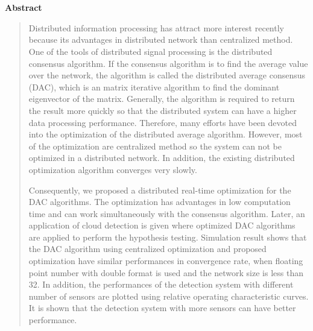 
\chapter*{}

\newenvironment{abstract} {  \pagestyle{empty}   \begin{center}   
{\Large \bfseries  Abstract}   \end{center}  
\begin{quote}} {\end{quote} }

\begin{abstract} 

\thispagestyle{empty}Distributed information processing has attract
more interest recently because its advantages in distributed network
than centralized method. One of the tools of distributed signal processing
is the distributed consensus algorithm. If the consensus algorithm
is to find the average value over the network, the algorithm is called
the distributed average consensus (DAC), which is an matrix iterative
algorithm to find the dominant eigenvector of the matrix. Generally,
the algorithm is required to return the result more quickly so that
the distributed system can have a higher data processing performance.
Therefore, many efforts have been devoted into the optimization of
the distributed average algorithm. However, most of the optimization
are centralized method so the system can not be optimized in a distributed
network. In addition, the existing distributed optimization algorithm
converges very slowly. 

Consequently, we proposed a distributed real-time optimization for
the DAC algorithms. The optimization has advantages in low computation
time and can work simultaneously with the consensus algorithm. Later,
an application of cloud detection is given where optimized DAC algorithms
are applied to perform the hypothesis testing. Simulation result shows
that the DAC algorithm using centralized optimization and proposed
optimization have similar performances in convergence rate, when floating
point number with double format is used and the network size is less
than 32. In addition, the performances of the detection system with
different number of sensors are plotted using relative operating characteristic
curves. It is shown that the detection system with more sensors can
have better performance. 



\end{abstract}

